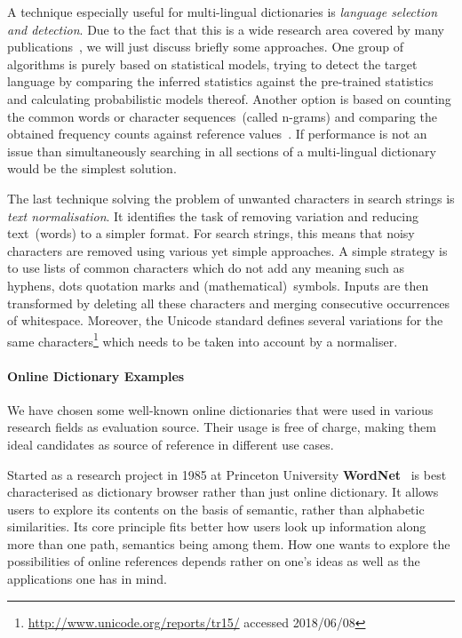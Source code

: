 \documentclass[draft,final]{vutinfth} %
\begin{document}
A technique especially useful for multi-lingual dictionaries is \textit{language selection and detection}. Due to the fact that this is a wide research area covered by many publications~\cite{mcnamee2005, lodhi2002, vatanen2010, selamat2016}, we will just discuss briefly some approaches. One group of algorithms is purely based on statistical models, trying to detect the target language by comparing the inferred statistics against the pre-trained statistics and calculating probabilistic models thereof. Another option is based on counting the common words or character sequences~(called n-grams) and comparing the obtained frequency counts against reference values~\cite{mcnamee2005}. If performance is not an issue than simultaneously searching in all sections of a multi-lingual dictionary would be the simplest solution. 

The last technique solving the problem of unwanted characters in search strings is \textit{text normalisation}. It identifies the task of removing variation and reducing text~(words) to a simpler format. For search strings, this means that noisy characters are removed using various yet simple approaches. A simple strategy is to use lists of common characters which do not add any meaning such as hyphens, dots quotation marks and (mathematical)~symbols. Inputs are then transformed by deleting all these characters and merging consecutive occurrences of whitespace. Moreover, the Unicode standard defines several variations for the same characters\footnote{\url{http://www.unicode.org/reports/tr15/} accessed 2018/06/08 } which needs to be taken into account by a normaliser. 

\paragraph{Online Dictionary Examples} We have chosen some well-known online dictionaries that were used in various research fields as evaluation
source. Their usage is free of charge, making them ideal candidates as source of reference in different use cases. 

Started as a research project in 1985 at Princeton University \textbf{WordNet}~\cite{fellbaum1998} is best characterised as dictionary browser rather than just online dictionary. It allows users to explore its contents on the basis of semantic, rather than alphabetic similarities. Its core principle fits better how users look up information along more than one path, semantics being among them. How one wants to explore the possibilities of online references depends rather on one's ideas as well as the applications one has in mind. 
\end{document}
